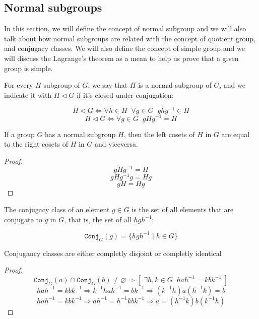 \subsection{Normal subgroups}
In this section, we will define the concept of normal subgroup and we will 
also talk about how normal subgroups are related with the concept of quotient group, 
and conjugacy classes. We will also define the concept of simple group and we will
discuss the Lagrange's theorem as a mean to help us prove that a given group is simple.

\begin{definition}
    For every $H$ subgroup of $G$, we say that $H$ is a normal subgroup of $G$, and we indicate it 
    with $H \triangleleft G$ if it's closed under conjugation:

    $$ H \triangleleft G \iff \forall h \in H\;\;\forall g \in G\;\; ghg^{-1} \in H $$
    $$ H \triangleleft G \iff \forall g \in G\;\; gHg^{-1} = H $$
\end{definition} \vspace{0.2em}

\begin{lemma} 
\label{lem:normal_cosets}
    If a group $G$ has a normal subgroup $H$, then the left cosets of $H$ in $G$ are equal to 
    the right cosets of $H$ in $G$ and viceversa.
\end{lemma} 
\begin{proof}
    $$ gHg^{-1} = H $$
    $$ gHg^{-1}g = Hg $$
    $$ gH = Hg $$
\end{proof} \vspace{0.2em}

\begin{definition}
    The conjugacy class of an element $g \in G$ is the set of all elements that are conjugate to $g$ 
    in $G$, that is, the set of all $hgh^{-1}$: 
    
    $$ \texttt{Conj}_{G}(g) = \{ hgh^{-1} \mid h \in G \} $$
\end{definition} \vspace{0.2em}

\begin{lemma}
\label{lem:conjugacy_classes}
    Conjugancy classes are either completly disjoint or completly identical
\end{lemma}
\begin{proof}
    
    $$ \texttt{Conj}_{G}(a) \cap \texttt{Conj}_{G}(b) \neq \varnothing \Rightarrow 
        [\; \exists h,k \in G\;\; hah^{-1} = kbk^{-1} \;] $$
    $$ hah^{-1} = kbk^{-1} \Rightarrow k^{-1}hah^{-1} = bk^{-1} \Rightarrow (k^{-1}h)a(h^{-1}k) = b $$
    $$ hah^{-1} = kbk^{-1} \Rightarrow ah^{-1} = h^{-1}kbk^{-1} \Rightarrow a = (h^{-1}k)b(k^{-1}h) $$
\end{proof} \vspace{0.2em}

